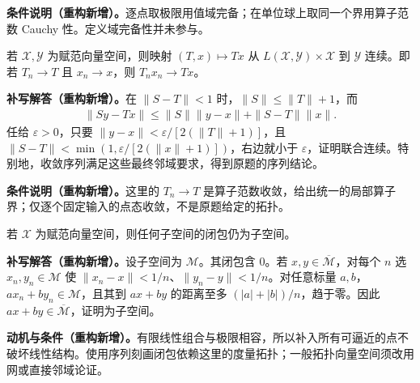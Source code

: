 \documentclass[../../main.tex]{subfiles}
\begin{document}
\begin{remark}
\textbf{条件说明（重构新增）。}逐点取极限用值域完备；在单位球上取同一个界用算子范数 Cauchy 性。定义域完备性并未参与。
\end{remark}
\begin{exercise}\label{exercise:ch05-evaluation-continuous}
若 $\mathcal X,\mathcal Y$ 为赋范向量空间，则映射 $(T,x)\mapsto Tx$ 从 $L(\mathcal X,\mathcal Y)\times\mathcal X$ 到 $\mathcal Y$ 连续。即若 $T_n\to T$ 且 $x_n\to x$，则 $T_nx_n\to Tx$。
\end{exercise}
\begin{solution}
\textbf{补写解答（重构新增）。}在 $\|S-T\|<1$ 时，$\|S\|\le\|T\|+1$，而
\begin{align*}
\|Sy-Tx\|\le\|S\|\|y-x\|+\|S-T\|\|x\|.
\end{align*}
任给 $\varepsilon>0$，只要 $\|y-x\|<\varepsilon/[2(\|T\|+1)]$，且 $\|S-T\|<\min(1,\varepsilon/[2(\|x\|+1)])$，右边就小于 $\varepsilon$，证明联合连续。特别地，收敛序列满足这些最终邻域要求，得到原题的序列结论。
\end{solution}
\begin{remark}
\textbf{条件说明（重构新增）。}这里的 $T_n\to T$ 是算子范数收敛，给出统一的局部算子界；仅逐个固定输入的点态收敛，不是原题给定的拓扑。
\end{remark}
\begin{exercise}\label{exercise:ch05-subspace-closure}
若 $\mathcal X$ 为赋范向量空间，则任何子空间的闭包仍为子空间。
\end{exercise}
\begin{solution}
\textbf{补写解答（重构新增）。}设子空间为 $\mathcal M$。其闭包含 $0$。若 $x,y\in\overline{\mathcal M}$，对每个 $n$ 选 $x_n,y_n\in\mathcal M$ 使 $\|x_n-x\|<1/n$、$\|y_n-y\|<1/n$。对任意标量 $a,b$，$ax_n+by_n\in\mathcal M$，且其到 $ax+by$ 的距离至多 $(|a|+|b|)/n$，趋于零。因此 $ax+by\in\overline{\mathcal M}$，证明为子空间。
\end{solution}
\begin{remark}
\textbf{动机与条件（重构新增）。}有限线性组合与极限相容，所以补入所有可逼近的点不破坏线性结构。使用序列刻画闭包依赖这里的度量拓扑；一般拓扑向量空间须改用网或直接邻域论证。
\end{remark}
\end{document}

